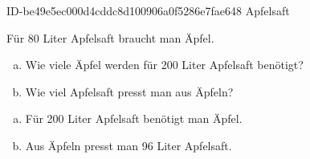 \begin{exercise}
      {ID-be49e5ec000d4cddc8d100906a0f5286e7fae648}
      {Apfelsaft}
  \ifproblem\problem\par
    Für \num{80} Liter Apfelsaft braucht man  Äpfel.
    \begin{enumerate}[a)]
      \item Wie viele Äpfel werden für \num{200} Liter Apfelsaft benötigt?
      \item Wie viel Apfelsaft presst man aus  Äpfeln?
    \end{enumerate}
  \fi
  \ifoutcome\outcome\par
    \begin{enumerate}[a)]
      \item Für \num{200} Liter Apfelsaft benötigt man  Äpfel.
      \item Aus  Äpfeln presst man \num{96} Liter Apfelsaft.
    \end{enumerate}
  \fi
\end{exercise}
